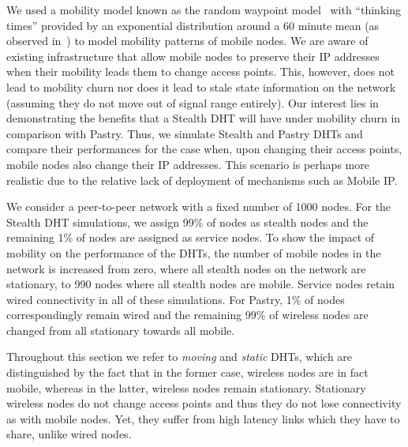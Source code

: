 \documentclass[conference]{IEEEtran}
\begin{document}
We used a mobility model known as the random waypoint
model~\cite{johnson96dynamic}\cite{broch98performance} with
``thinking times'' provided by an exponential distribution around a
60 minute mean (as observed in~\cite{kotz:campus}) to model mobility
patterns of mobile nodes. We are aware of existing infrastructure
that allow mobile nodes to preserve their IP addresses when their
mobility leads them to change access points. This, however, does not
lead to mobility churn nor does it lead to stale state information
on the network (assuming they do not move out of signal range
entirely). Our interest lies in demonstrating the benefits that a
Stealth DHT will have under mobility churn in comparison with
Pastry. Thus, we simulate Stealth and Pastry DHTs and compare their
performances for the case when, upon changing their access points,
mobile nodes also change their IP addresses. This scenario is
perhaps more realistic due to the relative lack of deployment of
mechanisms such as Mobile IP.

We consider a peer-to-peer network with a fixed number of 1000
nodes. For the Stealth DHT simulations, we assign 99\% of nodes as
stealth nodes and the remaining 1\% of nodes are assigned as service
nodes. To show the impact of mobility on the performance of the
DHTs, the number of mobile nodes in the network is increased from
zero, where all stealth nodes on the network are stationary, to 990
nodes where all stealth nodes are mobile. Service nodes retain wired
connectivity in all of these simulations. For Pastry, 1\% of nodes
correspondingly remain wired and the remaining 99\% of wireless
nodes are changed from all stationary towards all mobile.

Throughout this section we refer to {\em moving} and {\em static}
DHTs, which are distinguished by the fact that in the former case,
wireless nodes are in fact mobile, whereas in the latter, wireless
nodes remain stationary. Stationary wireless nodes do not change
access points and thus they do not lose connectivity as with mobile
nodes. Yet, they suffer from high latency links which they have to
share, unlike wired nodes.

\end{document}
